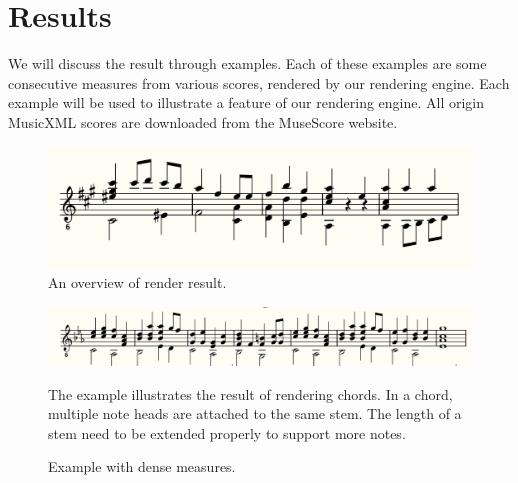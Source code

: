 \section{Results}
We will discuss the result through examples. Each of these examples are some consecutive measures from various scores, rendered by our rendering engine. Each example will be used to illustrate a feature of our rendering engine. All origin MusicXML scores are downloaded from the MuseScore website.

\newcommand{\renderscale}{0.3}

\begin{figure}[h]
    \centering
    \includegraphics[scale=\renderscale]{Figures/render-we-wish-you-a-merry-christmas.png}
    \caption{An overview of render result.}
    \label{fig:render-overview}
\end{figure}

\begin{figure}[h]
    \centering
    \includegraphics[scale=\renderscale]{Figures/render-People-Imprisoned-by-Destiny.png}
    \caption{Example with dense measures.}
    \label{fig:render-dense}
    \startdescription
     The example illustrates the result of rendering chords. In a chord, multiple note heads are attached to the same stem. The length of a stem need to be extended properly to support more notes.
\end{figure}




